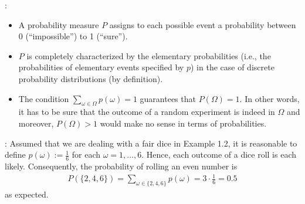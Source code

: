 \documentclass[letterpaper,10pt,english]{jupyterBook}
\begin{document}
\sphinxAtStartPar
{}:
\begin{itemize}
\item {} 
\sphinxAtStartPar
A probability measure \(P\) assigns to each possible event a probability between 0 (“impossible”) to 1 (“sure”).

\item {} 
\sphinxAtStartPar
\(P\) is completely characterized by the elementary probabilities (i.e., the probabilities of elementary events specified by \(p\)) in the case of discrete probability distributions (by definition).

\item {} 
\sphinxAtStartPar
The condition \(\sum_{\omega \in \Omega} p(\omega) = 1\) guarantees that \(P(\Omega) = 1\). In other words, it has to be sure that the outcome of a random experiment is indeed in \(\Omega\) and moreover, \(P(\Omega) > 1\) would make no sense in terms of probabilities.

\end{itemize}

\sphinxAtStartPar
{}: Assumed that we are dealing with a fair dice in Example 1.2, it is reasonable to define \(p(\omega):=\frac{1}{6}\) for each \(\omega=1, \dots,6\). Hence, each outcome of a dice roll is each likely. Consequently, the probability of rolling an even number is
\begin{equation*}
\begin{split}P(\{2, 4, 6\}) = \sum_{\omega \in \{2, 4, 6\}} p(\omega) = 3 \cdot \frac{1}{6} = 0.5\end{split}
\end{equation*}
\sphinxAtStartPar
as expected.
\end{document}
